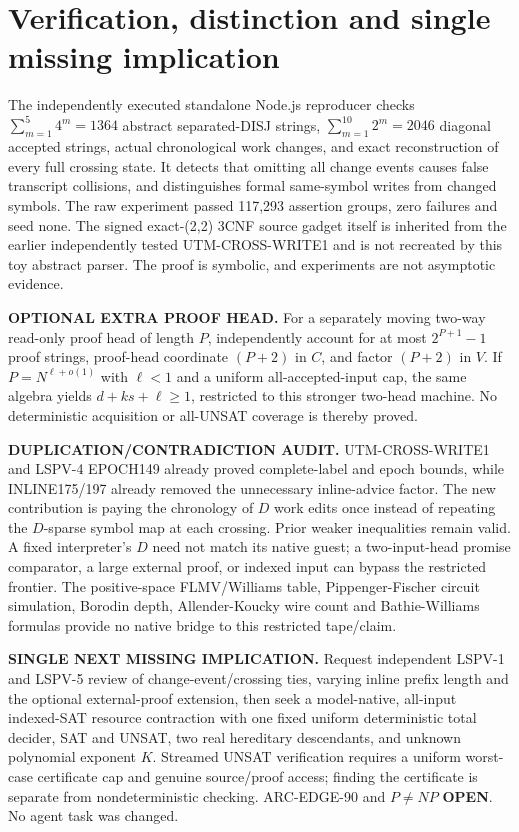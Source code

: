 \documentclass[11pt]{article}
\begin{document}
\section{Verification, distinction and single missing implication}
The independently executed standalone Node.js reproducer checks $\sum_{m=1}^{5}4^m=1364$ abstract separated-DISJ strings, $\sum_{m=1}^{10}2^m=2046$ diagonal accepted strings, actual chronological work changes, and exact reconstruction of every full crossing state. It detects that omitting all change events causes false transcript collisions, and distinguishes formal same-symbol writes from changed symbols. The raw experiment passed 117,293 assertion groups, zero failures and seed none. The signed exact-(2,2) 3CNF source gadget itself is inherited from the earlier independently tested UTM-CROSS-WRITE1 and is not recreated by this toy abstract parser. The proof is symbolic, and experiments are not asymptotic evidence.
\par\textbf{OPTIONAL EXTRA PROOF HEAD.} For a separately moving two-way read-only proof head of length $P$, independently account for at most $2^{P+1}-1$ proof strings, proof-head coordinate $(P+2)$ in $C$, and factor $(P+2)$ in $V$. If $P=N^{\ell+o(1)}$ with $\ell<1$ and a uniform all-accepted-input cap, the same algebra yields $d+ks+\ell\ge1$, restricted to this stronger two-head machine. No deterministic acquisition or all-UNSAT coverage is thereby proved.
\par\textbf{DUPLICATION/CONTRADICTION AUDIT.} UTM-CROSS-WRITE1 and LSPV-4 EPOCH149 already proved complete-label and epoch bounds, while INLINE175/197 already removed the unnecessary inline-advice factor. The new contribution is paying the chronology of $D$ work edits once instead of repeating the $D$-sparse symbol map at each crossing. Prior weaker inequalities remain valid. A fixed interpreter's $D$ need not match its native guest; a two-input-head promise comparator, a large external proof, or indexed input can bypass the restricted frontier. The positive-space FLMV/Williams table, Pippenger-Fischer circuit simulation, Borodin depth, Allender-Koucky wire count and Bathie-Williams formulas provide no native bridge to this restricted tape/claim.
\par\textbf{SINGLE NEXT MISSING IMPLICATION.} Request independent LSPV-1 and LSPV-5 review of change-event/crossing ties, varying inline prefix length and the optional external-proof extension, then seek a model-native, all-input indexed-SAT resource contraction with one fixed uniform deterministic total decider, SAT and UNSAT, two real hereditary descendants, and unknown polynomial exponent $K$. Streamed UNSAT verification requires a uniform worst-case certificate cap and genuine source/proof access; finding the certificate is separate from nondeterministic checking. ARC-EDGE-90 and $P\ne NP$ \textbf{OPEN}. No agent task was changed.
\end{document}
